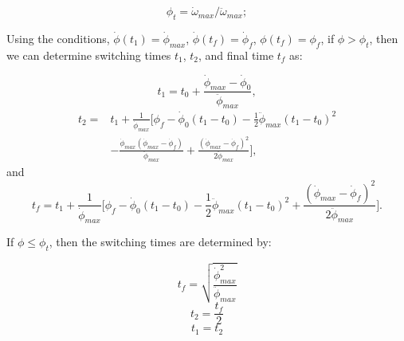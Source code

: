 \documentclass[letterpaper, preprint, paper,11pt]{AAS}	%
\begin{document}
	 \begin{equation}\label{phi_t}
		 \phi_t = \dot{\omega}_{max}/\ddot{\omega}_{max};
	 \end{equation}
	 
	 Using the conditions, $\dot{\phi}(t_1)=\dot{\phi}_{max}$, $\dot{\phi}(t_f)=\dot{\phi}_f$, $\phi(t_f)=\phi_f$, if $\phi > \phi_t$, then we can determine switching times $t_1$, $t_2$, and final time $t_f$ as:
	
	\begin{equation}\label{t1cons}
	t_1=t_0+\frac{\dot{\phi}_{max}-\dot{\phi}_0}{\ddot{\phi}_{max}},
	\end{equation}
	\begin{equation}\label{t2cons}
	\begin{split}
	t_2=&t_1+\frac{1}{\dot{\phi}_{max}}\Big[ \phi_f-\dot{\phi}_0(t_1-t_0)-\frac{1}{2}\ddot{\phi}_{max}(t_1-t_0)^2\\
	&-\frac{\dot{\phi}_{max}(\dot{\phi}_{max}-\dot{\phi}_f)}{\ddot{\phi}_{max}}+\frac{(\dot{\phi}_{max}-\dot{\phi}_f)^2}{2\ddot{\phi}_{max}} \Big],
	\end{split}
	\end{equation}
	and
	\begin{equation}\label{tfcons}
	t_f=t_1+\frac{1}{\dot{\phi}_{max}}\Big[ \phi_f-\dot{\phi}_0(t_1-t_0)-\frac{1}{2}\ddot{\phi}_{max}(t_1-t_0)^2+\frac{(\dot{\phi}_{max}-\dot{\phi}_f)^2}{2\ddot{\phi}_{max}} \Big].
	\end{equation}
	
	If $\phi \leq \phi_t$, then the switching times are determined by: 
	
	\begin{equation}\label{tfcons_phit}
		t_f = \sqrt{\frac{\dot{\phi}_{max}^2}{\ddot{\phi}_{max}}}
	\end{equation}
	\begin{equation}\label{t2cons_phit}
		t_2 = \frac{t_f}{2}
	\end{equation}
	\begin{equation}\label{t1cons_phit}
		t_1 = t_2 
	\end{equation}
		
\end{document}
